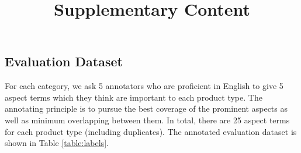 \documentclass{article}
\title{Supplementary Content}
\newcommand{\tabref}[1]{Table \ref{#1}}
\begin{document}
	\maketitle
	
	\subsection*{Evaluation Dataset}
	For each category, we ask 5 annotators who are proficient in English to give 5 aspect terms which they think are important to each product type.
	The annotating principle is to pursue the best coverage of the prominent aspects as well as minimum overlapping between them.
	In total, there are 25 aspect terms for each product type (including duplicates).
	The annotated evaluation dataset is shown in \tabref{table:labels}.
	
\end{document}
